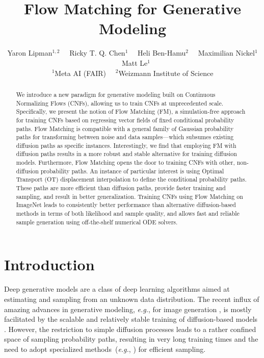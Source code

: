 \documentclass{article}
\title{Flow Matching for Generative Modeling}
\author{Yaron Lipman$^{1,2}$ \ \ Ricky T. Q. Chen$^{1}$ \ \ Heli Ben-Hamu$^{2}$ \ \ Maximilian Nickel$^{1}$ \ \ Matt Le$^{1}$ \\
    $^1$Meta AI (FAIR)  \ \
    $^2$Weizmann Institute of Science
}
\makeatletter
\renewcommand*{\eg}{{\it e.g.}\@\xspace}
\makeatother
\begin{document}
\maketitle

\begin{abstract}
We introduce a new paradigm for generative modeling built on Continuous Normalizing Flows (CNFs), allowing us to train CNFs at unprecedented scale. Specifically, we present the notion of Flow Matching (FM), a simulation-free approach for training CNFs based on regressing vector fields of fixed conditional probability paths. Flow Matching is compatible with a general family of Gaussian probability paths for transforming between noise and data samples---which subsumes existing diffusion paths as specific instances. Interestingly, we find that employing FM with diffusion paths results in a more robust and stable alternative for training diffusion models. Furthermore, Flow Matching opens the door to training CNFs with other, non-diffusion probability paths. An instance of particular interest is using Optimal Transport (OT) displacement interpolation to define the conditional probability paths. These paths are more efficient than diffusion paths, provide faster training and sampling, and result in better generalization. Training CNFs using Flow Matching on ImageNet leads to consistently better performance than alternative diffusion-based methods in terms of both likelihood and sample quality, and allows fast and reliable sample generation using off-the-shelf numerical ODE solvers.\vspace{-5pt}
\end{abstract}


\section{Introduction}\vspace{-3pt}
%
Deep generative models are a class of deep learning algorithms aimed at estimating and sampling from an unknown data distribution.
%
The recent influx of amazing advances in generative modeling, \eg, for image generation \citet{ramesh2022hierarchical,rombach2022high}, is mostly facilitated by the scalable and relatively stable training of diffusion-based models \citet{ho2020denoising,song2020score}. However, the restriction to simple diffusion processes leads to a rather confined space of sampling probability paths, resulting in very long training times and the need to adopt specialized methods~(\eg, \citet{song2020denoising,zhang2022fast}) for efficient sampling.
\end{document}
